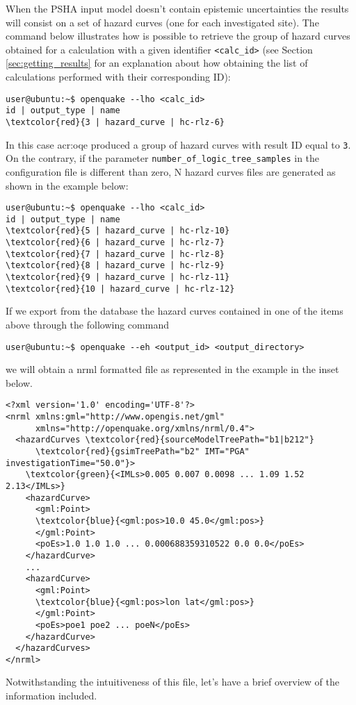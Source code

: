 When the PSHA input model doesn't contain epistemic uncertainties
the results will consist on a set of hazard curves (one for each 
investigated site). 
The command below illustrates how is possible to retrieve the group
of hazard curves obtained for a calculation with a given
identifier \texttt{<calc\_id>} (see Section \ref{sec:getting_results}
for an explanation about how obtaining the list of calculations 
performed with their corresponding ID):
\begin{Verbatim}[frame=single, commandchars=\\\{\}, fontsize=\small]
user@ubuntu:~$ openquake --lho <calc_id>
id | output_type | name
\textcolor{red}{3 | hazard_curve | hc-rlz-6}
\end{Verbatim}
In this case \gls{acr:oqe} produced a group of hazard curves with 
result ID equal to \texttt{3}.
% 
On the contrary, if the parameter \texttt{number\_of\_logic\_tree\_samples}
in the configuration file is different than zero, N hazard curves files are generated as shown in the example below:
\begin{Verbatim}[frame=single, commandchars=\\\{\}, fontsize=\small]
user@ubuntu:~$ openquake --lho <calc_id>
id | output_type | name
\textcolor{red}{5 | hazard_curve | hc-rlz-10}
\textcolor{red}{6 | hazard_curve | hc-rlz-7}
\textcolor{red}{7 | hazard_curve | hc-rlz-8}
\textcolor{red}{8 | hazard_curve | hc-rlz-9}
\textcolor{red}{9 | hazard_curve | hc-rlz-11}
\textcolor{red}{10 | hazard_curve | hc-rlz-12}
\end{Verbatim}
If we export from the database the hazard curves contained in 
one of the items above through the following command
\begin{Verbatim}[frame=single, commandchars=\\\{\}, fontsize=\small]
user@ubuntu:~$ openquake --eh <output_id> <output_directory>
\end{Verbatim}
we will obtain a nrml formatted file as represented in the example
in the inset below.
\begin{Verbatim}[frame=single, commandchars=\\\{\}, fontsize=\small]
<?xml version='1.0' encoding='UTF-8'?>
<nrml xmlns:gml="http://www.opengis.net/gml" 
      xmlns="http://openquake.org/xmlns/nrml/0.4">
  <hazardCurves \textcolor{red}{sourceModelTreePath="b1|b212"} 
      \textcolor{red}{gsimTreePath="b2" IMT="PGA" investigationTime="50.0"}>
    \textcolor{green}{<IMLs>0.005 0.007 0.0098 ... 1.09 1.52 2.13</IMLs>}
    <hazardCurve>
      <gml:Point>
      \textcolor{blue}{<gml:pos>10.0 45.0</gml:pos>}
      </gml:Point>
      <poEs>1.0 1.0 1.0 ... 0.000688359310522 0.0 0.0</poEs>
    </hazardCurve>
    ...
    <hazardCurve>
      <gml:Point>
      \textcolor{blue}{<gml:pos>lon lat</gml:pos>}
      </gml:Point>
      <poEs>poe1 poe2 ... poeN</poEs>
    </hazardCurve>
  </hazardCurves>
</nrml>
\end{Verbatim}
Not\-with\-stand\-ing the intuitiveness of this file, let's have a brief 
overview of the information included.


